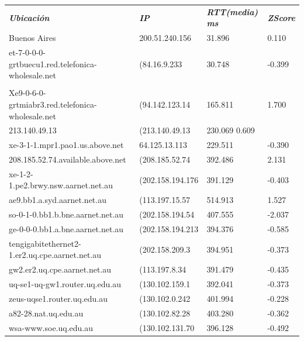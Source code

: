 \begin{tabular}{llll}
	\textit{\textbf{Ubicaci\'on}}	&	\textit{\textbf{IP}}	&	\textit{\textbf{RTT(media) ms}}	&	\textit{\textbf{ZScore}}	\\
	Buenos Aires	&	200.51.240.156	&	31.896	&		0.110	\\
	et-7-0-0-0-grtbuecu1.red.telefonica-wholesale.net	&	(84.16.9.233	&	30.748	&	-0.399	\\
	\\	Xe9-0-6-0-grtmiabr3.red.telefonica-wholesale.net	&	(94.142.123.14	&	165.811	&	1.700	\\
	213.140.49.13	&	(213.140.49.13	&	230.069	0.609	\\
	xe-3-1-1.mpr1.pao1.us.above.net	&	64.125.13.113	&	229.511	&	-0.390	\\
	208.185.52.74.available.above.net	&	(208.185.52.74	&	392.486	&	2.131	\\
	xe-1-2-1.pe2.brwy.nsw.aarnet.net.au	&	(202.158.194.176	&	391.129	&	-0.403	\\
	ae9.bb1.a.syd.aarnet.net.au	&	(113.197.15.57	&	514.913	&	1.527	\\
	so-0-1-0.bb1.b.bne.aarnet.net.au	&	(202.158.194.54	&	407.555	&	-2.037	\\
	ge-0-0-0.bb1.a.bne.aarnet.net.au	&	(202.158.194.213	&	394.376	&	-0.585	\\
	tengigabitethernet2-1.er2.uq.cpe.aarnet.net.au	&	(202.158.209.3	&	394.951	&	-0.373	\\
	gw2.er2.uq.cpe.aarnet.net.au	&	(113.197.8.34	&	391.479	&	-0.435	\\
	uq-se1-uq-gw1.router.uq.edu.au	&	(130.102.159.1	&	392.041	&	-0.373	\\
	zeus-uqse1.router.uq.edu.au	&	(130.102.0.242	&	401.994	&	-0.228	\\
	a82-28.nat.uq.edu.au	&	(130.102.82.28	&	403.280	&	-0.362	\\
	wsa-www.soe.uq.edu.au	&	(130.102.131.70	&	396.128	&	-0.492	\\
\end{tabular}

~


